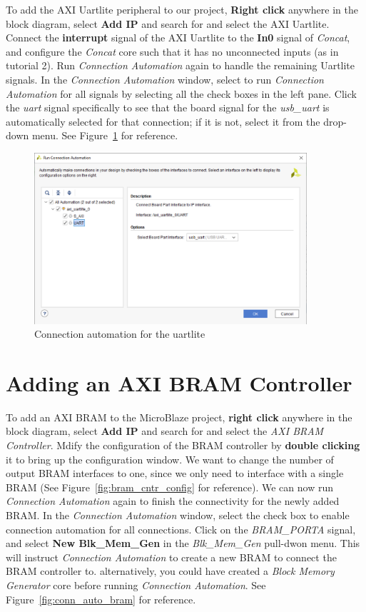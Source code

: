 \documentclass[11pt]{article}
\begin{document}
To add the AXI Uartlite peripheral to our project, \textbf{Right click} anywhere in the block diagram, select \textbf{Add IP} and search for and select the AXI Uartlite. Connect the \textbf{interrupt} signal of the AXI Uartlite to the \textbf{In0} signal of \textit{Concat}, and configure the \textit{Concat} core such that it has no unconnected inputs (as in tutorial 2). Run \textit{Connection Automation} again to handle the remaining Uartlite signals. In the \textit{Connection Automation} window, select to run \textit{Connection Automation} for all signals by selecting all the check boxes in the left pane. Click the \textit{uart} signal specifically to see that the board signal for the \textit{usb\_uart} is automatically selected for that connection; if it is not, select it from the drop-down menu. See Figure~\ref{fig:conn_auto_uart} for reference.

\begin{figure}[h]
    \centering
    \includegraphics[width=0.9\textwidth]{images/conn_auto_uart.png}
    \caption{Connection automation for the uartlite}
    \label{fig:conn_auto_uart}
\end{figure}




\section{Adding an AXI BRAM Controller}
\label{sec:add_memory}
To add an AXI BRAM to the MicroBlaze project, \textbf{right click} anywhere in the block diagram, select \textbf{Add IP} and search for and select the \textit{AXI BRAM Controller}. Mdify the configuration of the BRAM controller by \textbf{double clicking} it to bring up the configuration window. We want to change the number of output BRAM interfaces to one, since we only need to interface with a single BRAM (See Figure~\ref{fig:bram_cntr_config} for reference). We can now run \textit{Connection Automation} again to finish the connectivity for the newly added BRAM. In the \textit{Connection Automation} window, select the check box to enable connection automation for all connections. Click on the \textit{BRAM\_PORTA} signal, and select \textbf{New Blk\_Mem\_Gen} in the \textit{Blk\_Mem\_Gen} pull-dwon menu. This will instruct \textit{Connection Automation} to create a new BRAM to connect the BRAM controller to. alternatively, you could have created a \textit{Block Memory Generator} core before running \textit{Connection Automation}. See Figure~\ref{fig:conn_auto_bram} for reference.
\end{document}
